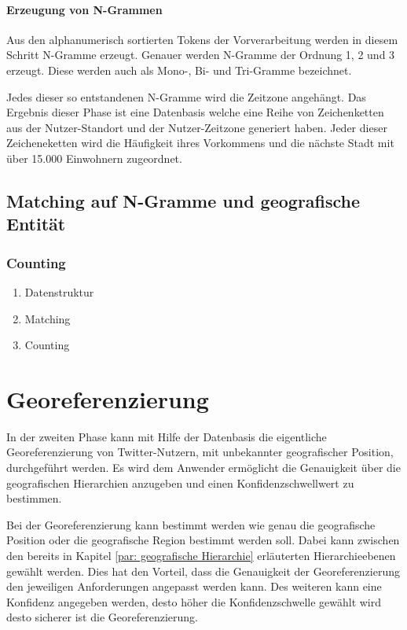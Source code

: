 		  		\paragraph{Erzeugung von N-Grammen}
			  	Aus den alphanumerisch sortierten Tokens der Vorverarbeitung werden in diesem Schritt N-Gramme erzeugt.
			  	Genauer werden N-Gramme der Ordnung 1, 2 und 3 erzeugt.
			  	Diese werden auch als Mono-, Bi- und Tri-Gramme bezeichnet.  

			  	Jedes dieser so entstandenen N-Gramme wird die Zeitzone angehängt.  
				Das Ergebnis dieser Phase ist eine Datenbasis welche eine Reihe von Zeichenketten aus der Nutzer-Standort und der Nutzer-Zeitzone generiert haben. 
				Jeder dieser Zeicheneketten wird die Häufigkeit ihres Vorkommens und die nächste Stadt mit über 15.000 Einwohnern zugeordnet. 

				
		\subsection{Matching auf N-Gramme und geografische Entität}

			\subsubsection{Counting} 


	\begin{enumerate}
		\item Datenstruktur
		\item Matching
		\item Counting  
	\end{enumerate}

	\section{Georeferenzierung}   
	In der zweiten Phase kann mit Hilfe der Datenbasis die eigentliche Georeferenzierung von Twitter-Nutzern, mit unbekannter geografischer Position, durchgeführt werden. 
	Es wird dem Anwender ermöglicht die Genauigkeit über die geografischen Hierarchien anzugeben und einen Konfidenzschwellwert zu bestimmen.

	Bei der Georeferenzierung kann bestimmt werden wie genau die geografische Position oder die geografische Region bestimmt werden soll. 
	Dabei kann zwischen den bereits in Kapitel \ref{par: geografische Hierarchie} erläuterten Hierarchieebenen gewählt werden.
	Dies hat den Vorteil, dass die Genauigkeit der Georeferenzierung den jeweiligen Anforderungen angepasst werden kann.
	Des weiteren kann eine Konfidenz angegeben werden, desto höher die Konfidenzschwelle gewählt wird desto sicherer ist die Georeferenzierung. 
	

